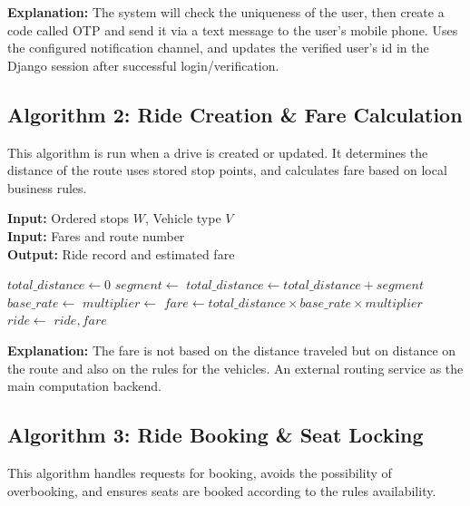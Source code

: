 \textbf{Explanation:} The system will check the uniqueness of the user, then create a code called OTP and send it via a text message to the user's mobile phone. Uses the configured notification channel, and updates the verified user's id in the Django session after successful login/verification.

\subsection{Algorithm 2: Ride Creation \& Fare Calculation}

This algorithm is run when a drive is created or updated. It determines the distance of the route uses stored stop points, and calculates fare based on local business rules.

\begin{breakablealgorithm}
\caption{Ride Creation and Fare Calculation}
\textbf{Input:} Ordered stops $W$, Vehicle type $V$ \\
\textbf{Input:} Fares and route number \\
\textbf{Output:} Ride record and estimated fare
\begin{algorithmic}[1]
    \State $total\_distance \gets 0$
        \State $segment \gets$ 
        \State $total\_distance \gets total\_distance + segment$
        \EndFor
    \State $base\_rate \gets$ 
    \State $multiplier \gets$ 
    \State $fare \gets total\_distance \times base\_rate \times multiplier$
    \State $ride \gets$ 
    \State \Return $ride, fare$
\EndFunction
\end{algorithmic}
\end{breakablealgorithm}

\textbf{Explanation:} The fare is not based on the distance traveled but on distance on the route and also on the rules for the vehicles. An external routing service as the main computation backend.

\subsection{Algorithm 3: Ride Booking \& Seat Locking}

This algorithm handles requests for booking, avoids the possibility of overbooking, and ensures seats are booked according to the rules availability.

